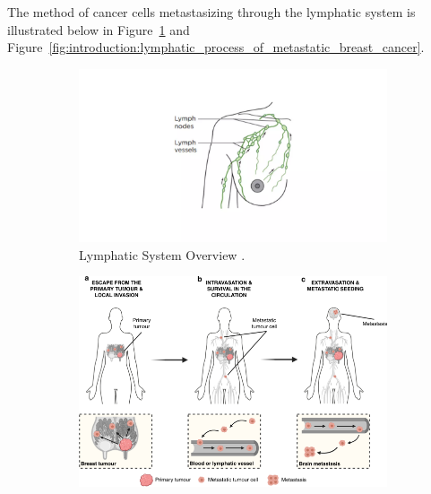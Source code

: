 The method of cancer cells metastasizing through the lymphatic system is illustrated below in Figure~\ref{fig:introduction:lymphatic_system_in_a_breast} and Figure~\ref{fig:introduction:lymphatic_process_of_metastatic_breast_cancer}.

\begin{figure}[h!]
        \begin{minipage}{0.92\textwidth}
                \centering
                \begin{subfigure}[b]{0.45\textwidth}
                        \centering
                        \includegraphics[width=\textwidth]{../figs/introduction/lymphatic_system_in_a_breast.png}
                        \caption{Lymphatic System Overview \cite{RefWorks:RefID:37-memorialsurgery}.}
                        \label{fig:introduction:lymphatic_system_in_a_breast}
                \end{subfigure}
                \begin{subfigure}[b]{0.45\textwidth}
                        \centering
                        \includegraphics[width=\textwidth]{../figs/introduction/process_of_metastatic_breast_cancer.png}

\end{subfigure}
\end{minipage}
\end{figure}
